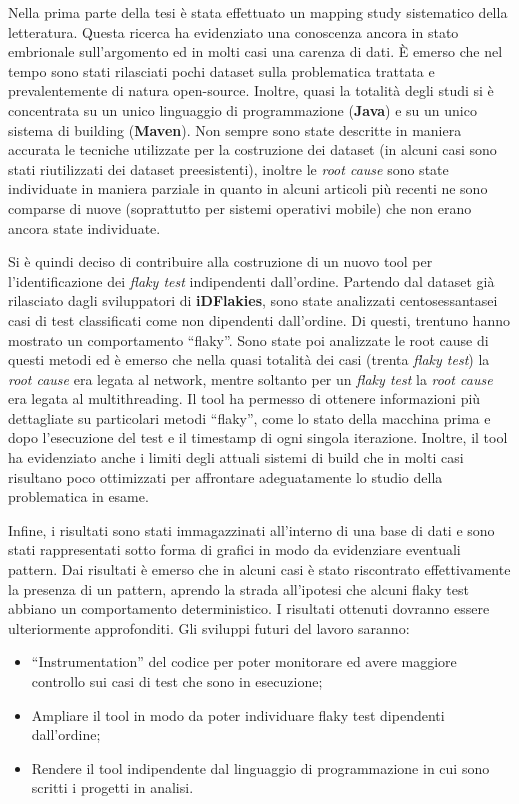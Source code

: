 \fancyhf{}
\fancyhead[C]{}
Nella prima parte della tesi è stata effettuato un mapping study sistematico della letteratura. Questa ricerca ha evidenziato una conoscenza ancora in stato embrionale sull’argomento ed in molti casi una carenza di dati. È emerso che nel tempo sono stati rilasciati pochi dataset sulla problematica trattata e prevalentemente di natura open-source. Inoltre, quasi la totalità degli studi si è concentrata su un unico linguaggio di programmazione (\textbf{Java}) e su un unico sistema di building (\textbf{Maven}). Non sempre sono state descritte in maniera accurata le tecniche utilizzate per la costruzione dei dataset (in alcuni casi sono stati riutilizzati dei dataset preesistenti), inoltre le \emph{root cause} sono state individuate in maniera parziale in quanto in alcuni articoli più recenti ne sono comparse di nuove (soprattutto per sistemi operativi mobile) che non erano ancora state individuate.

Si è quindi deciso di contribuire alla costruzione di un nuovo tool per l’identificazione dei \emph{flaky test} indipendenti dall’ordine. Partendo dal dataset già rilasciato dagli sviluppatori di \textbf{iDFlakies}, sono state analizzati centosessantasei casi di test classificati come non dipendenti dall’ordine. Di questi, trentuno hanno mostrato un comportamento “flaky”. Sono state poi analizzate le root cause di questi metodi ed è emerso che nella quasi totalità dei casi (trenta \emph{flaky test}) la \emph{root cause} era legata al network, mentre soltanto per un \emph{flaky test} la \emph{root cause} era legata al multithreading. Il tool ha permesso di ottenere informazioni più dettagliate su particolari metodi “flaky”, come lo stato della macchina prima e dopo l’esecuzione del test e il timestamp di ogni singola iterazione. Inoltre, il tool ha evidenziato anche i limiti degli attuali sistemi di build che in molti casi risultano poco ottimizzati per affrontare adeguatamente lo studio della problematica in esame.

Infine, i risultati sono stati immagazzinati all’interno di una base di dati e sono
stati rappresentati sotto forma di grafici in modo da evidenziare eventuali pattern. Dai risultati è emerso che in alcuni casi è stato riscontrato effettivamente la presenza di un pattern, aprendo la strada all’ipotesi che alcuni flaky test abbiano un comportamento deterministico. I risultati ottenuti dovranno essere ulteriormente approfonditi.
Gli sviluppi futuri del lavoro saranno:
\begin{itemize}
\item “Instrumentation” del codice per poter monitorare ed avere maggiore controllo sui casi di test che sono in esecuzione;
\item Ampliare il tool in modo da poter individuare flaky test dipendenti dall’ordine;
\item Rendere il tool indipendente dal linguaggio di programmazione in cui sono scritti i progetti in analisi.
\end{itemize}